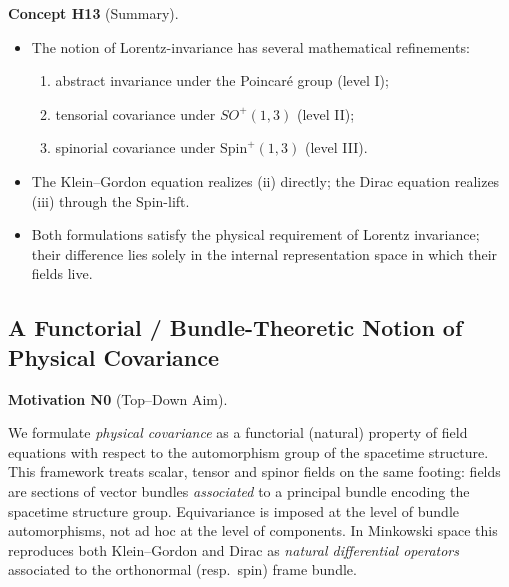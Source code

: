 \documentclass[10pt, letterpaper]{article}
\newcommand{\Spin}{\mathrm{Spin}}
\newcommand{\CustomHeading}[3]{%
  \par\medskip\noindent%
  \textbf{#1 #2} \textnormal{(#3)}.\enskip%
}
\newenvironment{CONC}[2]{\begin{unitbox}\CustomHeading{Concept}{#1}{#2}}{\end{unitbox}}
\newenvironment{MOT}[2]{\begin{unitbox}\CustomHeading{Motivation}{#1}{#2}}{\end{unitbox}}
\begin{document}
\begin{CONC}{H13}{Summary}
\begin{itemize}
\item The notion of Lorentz-invariance has several mathematical refinements:
  \begin{enumerate}[label=\roman*)]
  \item abstract invariance under the Poincaré group (level I);
  \item tensorial covariance under $SO^+(1,3)$ (level II);
  \item spinorial covariance under $\Spin^+(1,3)$ (level III).
  \end{enumerate}
\item The Klein--Gordon equation realizes (ii) directly; the Dirac equation realizes (iii) through the Spin-lift.
\item Both formulations satisfy the physical requirement of Lorentz invariance; their difference lies solely in the internal representation space in which their fields live.
\end{itemize}
\end{CONC}





\pagebreak

\subsection{A Functorial / Bundle-Theoretic Notion of Physical Covariance}

\begin{MOT}{N0}{Top--Down Aim}
We formulate \emph{physical covariance} as a functorial (natural) property of field equations with respect to the automorphism group of the spacetime structure.  
This framework treats scalar, tensor and spinor fields on the same footing: fields are sections of vector bundles \emph{associated} to a principal bundle encoding the spacetime structure group.  
Equivariance is imposed at the level of bundle automorphisms, not ad hoc at the level of components.  
In Minkowski space this reproduces both Klein--Gordon and Dirac as \emph{natural differential operators} associated to the orthonormal (resp.\ spin) frame bundle.
\end{MOT}
\end{document}
